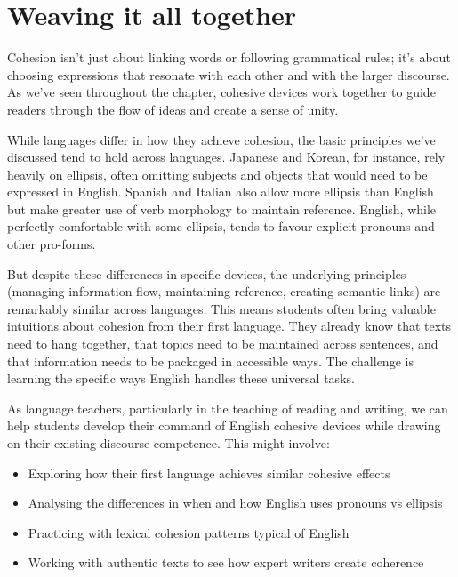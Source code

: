 \section{Weaving it all together} 

Cohesion isn't just about linking words or following grammatical rules; it's about choosing expressions that resonate with each other and with the larger discourse. As we've seen throughout the chapter, cohesive devices work together to guide readers through the flow of ideas and create a sense of unity.

While languages differ in how they achieve cohesion, the basic principles we've discussed tend to hold across languages. Japanese and Korean, for instance, rely heavily on ellipsis, often omitting subjects and objects that would need to be expressed in English. Spanish and Italian also allow more ellipsis than English but make greater use of verb morphology to maintain reference. English, while perfectly comfortable with some ellipsis, tends to favour explicit pronouns and other pro-forms.

But despite these differences in specific devices, the underlying principles (managing information flow, maintaining reference, creating semantic links) are remarkably similar across languages. This means students often bring valuable intuitions about cohesion from their first language. They already know that texts need to hang together, that topics need to be maintained across sentences, and that information needs to be packaged in accessible ways. The challenge is learning the specific ways English handles these universal tasks.

As language teachers, particularly in the teaching of reading and writing, we can help students develop their command of English cohesive devices while drawing on their existing discourse competence. This might involve:

\begin{itemize}[noitemsep]
    \item Exploring how their first language achieves similar cohesive effects
    \item Analysing the differences in when and how English uses pronouns vs ellipsis
    \item Practicing with lexical cohesion patterns typical of English
    \item Working with authentic texts to see how expert writers create coherence
\end{itemize}

